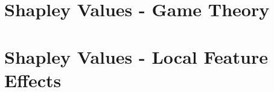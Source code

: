 \documentclass[11pt,compress,t,notes=noshow, aspectratio=169, xcolor=table]{beamer}
\begin{document}



\section{Shapley Values - Game Theory}


\section{Shapley Values - Local Feature Effects}

\end{document}
